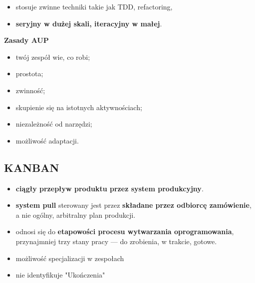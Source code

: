 \documentclass[a4paper]{article}
\begin{document}
    \begin{itemize}
        \item stosuje zwinne techniki takie jak TDD, refactoring,
        \item \textbf{seryjny w dużej skali, iteracyjny w małej}.
    \end{itemize}

    \textbf{Zasady AUP}
    \begin{itemize}
        \item twój zespół wie, co robi;
        \item prostota;
        \item zwinność;
        \item skupienie się na istotnych aktywnościach;
        \item niezależność od narzędzi;
        \item możliwość adaptacji.
    \end{itemize}



    \subsection{KANBAN}


    \begin{itemize}
        \item \textbf{ciągły przepływ produktu przez system produkcyjny}.
        \item \textbf{system pull} sterowany
        jest przez \textbf{składane przez odbiorcę zamówienie}, a nie ogólny, arbitralny plan produkcji.
        \item odnosi się do \textbf{etapowości procesu wytwarzania
        oprogramowania}, przynajmniej trzy stany pracy — do zrobienia, w trakcie, gotowe.
        \item możliwość specjalizacji w zespołach
        \item nie identyfikuje "Ukończenia"
    \end{itemize}
\end{document}
